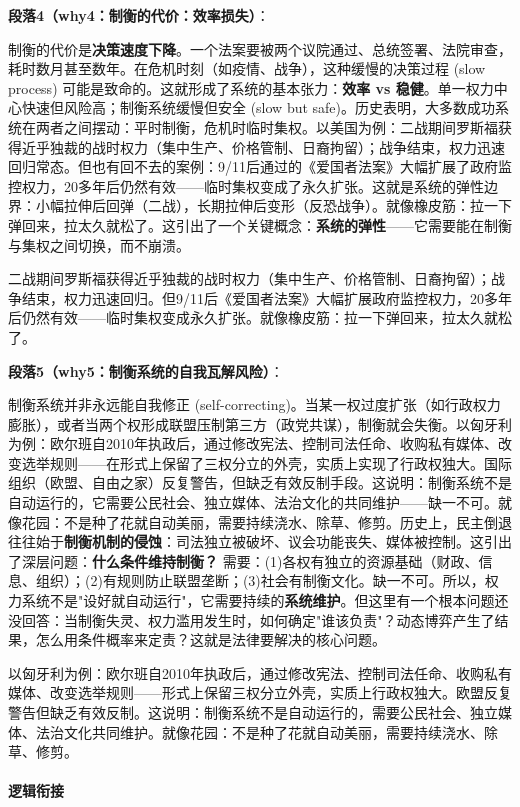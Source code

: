 \documentclass[../main.tex]{subfiles}
\begin{document}
	\textbf{段落4（why4：制衡的代价：效率损失）}：  

	制衡的代价是\textbf{决策速度下降}。一个法案要被两个议院通过、总统签署、法院审查，耗时数月甚至数年。在危机时刻（如疫情、战争），这种缓慢的决策过程 (slow process) 可能是致命的。这就形成了系统的基本张力：\textbf{效率 vs 稳健}。单一权力中心快速但风险高；制衡系统缓慢但安全 (slow but safe)。历史表明，大多数成功系统在两者之间摆动：平时制衡，危机时临时集权。以美国为例：二战期间罗斯福获得近乎独裁的战时权力（集中生产、价格管制、日裔拘留）；战争结束，权力迅速回归常态。但也有回不去的案例：9/11后通过的《爱国者法案》大幅扩展了政府监控权力，20多年后仍然有效——临时集权变成了永久扩张。这就是系统的弹性边界：小幅拉伸后回弹（二战），长期拉伸后变形（反恐战争）。就像橡皮筋：拉一下弹回来，拉太久就松了。这引出了一个关键概念：\textbf{系统的弹性}——它需要能在制衡与集权之间切换，而不崩溃。
	
	二战期间罗斯福获得近乎独裁的战时权力（集中生产、价格管制、日裔拘留）；战争结束，权力迅速回归。但9/11后《爱国者法案》大幅扩展政府监控权力，20多年后仍然有效——临时集权变成永久扩张。就像橡皮筋：拉一下弹回来，拉太久就松了。

	\textbf{段落5（why5：制衡系统的自我瓦解风险）}：  

	制衡系统并非永远能自我修正 (self-correcting)。当某一权过度扩张（如行政权力膨胀），或者当两个权形成联盟压制第三方（政党共谋），制衡就会失衡。以匈牙利为例：欧尔班自2010年执政后，通过修改宪法、控制司法任命、收购私有媒体、改变选举规则——在形式上保留了三权分立的外壳，实质上实现了行政权独大。国际组织（欧盟、自由之家）反复警告，但缺乏有效反制手段。这说明：制衡系统不是自动运行的，它需要公民社会、独立媒体、法治文化的共同维护——缺一不可。就像花园：不是种了花就自动美丽，需要持续浇水、除草、修剪。历史上，民主倒退往往始于\textbf{制衡机制的侵蚀}：司法独立被破坏、议会功能丧失、媒体被控制。这引出了深层问题：\textbf{什么条件维持制衡？} 需要：(1)各权有独立的资源基础（财政、信息、组织）；(2)有规则防止联盟垄断；(3)社会有制衡文化。缺一不可。所以，权力系统不是"设好就自动运行"，它需要持续的\textbf{系统维护}。但这里有一个根本问题还没回答：当制衡失灵、权力滥用发生时，如何确定"谁该负责"？动态博弈产生了结果，怎么用条件概率来定责？这就是法律要解决的核心问题。
	
	以匈牙利为例：欧尔班自2010年执政后，通过修改宪法、控制司法任命、收购私有媒体、改变选举规则——形式上保留三权分立外壳，实质上行政权独大。欧盟反复警告但缺乏有效反制。这说明：制衡系统不是自动运行的，需要公民社会、独立媒体、法治文化共同维护。就像花园：不是种了花就自动美丽，需要持续浇水、除草、修剪。

	\paragraph*{逻辑衔接}
\end{document}
